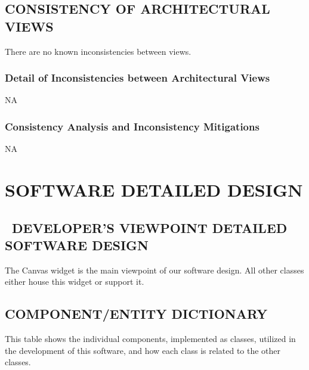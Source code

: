 \documentclass[twoside,letterpaper]{article}
\begin{document}
{\subsection[CONSISTENCY OF ARCHITECTURAL
VIEWS]{\bfseries\color{black} CONSISTENCY OF
ARCHITECTURAL VIEWS}
{\color{black}
There are no known inconsistencies between views. }

\subsubsection{Detail of Inconsistencies between Architectural Views}
{\color{black}
NA}

\subsubsection{Consistency Analysis and Inconsistency Mitigations}
{\color{black}
NA}

\clearpage
\section{SOFTWARE DETAILED DESIGN}

\bigskip

\subsection[\ DEVELOPER{\textquoteright}S VIEWPOINT DETAILED SOFTWARE
DESIGN]{\foreignlanguage{english}{\ }\foreignlanguage{english}{DEVELOPER{\textquoteright}S
VIEWPOINT DETAILED SOFTWARE DESIGN}}

{\color{black}
The Canvas widget is the main viewpoint of our software design.  
All other classes either house this widget or support it.}

\subsection[COMPONENT/ENTITY DICTIONARY]{\bfseries\color{black} COMPONENT/ENTITY DICTIONARY}
{\color{black}
This table shows the individual components, implemented as classes, utilized in the development of this software,
and how each class is related to the other classes.}

}
\end{document}
